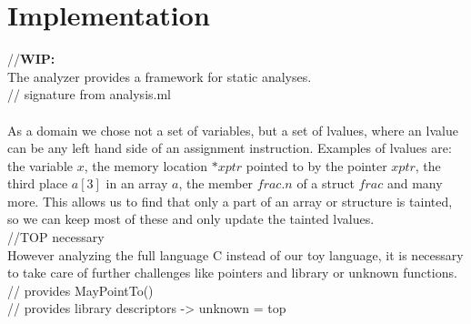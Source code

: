  \section{Implementation}
  //\textbf{WIP:}\\
    The \gob analyzer provides a framework for static analyses.\\ 
    // signature from analysis.ml\\
    \\
    As a domain we chose not a set of variables, but a set of lvalues, where an lvalue can be any left hand side of an assignment instruction. Examples of lvalues are: the variable $x$, the memory location $*xptr$ pointed to by the pointer $xptr$, the third place $a[3]$ in an array $a$, the member $frac.n$ of a struct $frac$ and many more. This allows us to find that only a part of an array or structure is tainted, so we can keep most of these and only update the tainted lvalues.\\
    //TOP necessary\\
    However analyzing the full language C instead of our toy language, it is necessary to take care of further challenges like pointers and library or unknown functions.\\
    // \gob provides \textsf{MayPointTo}()\\
    // \gob provides library descriptors -> unknown = top\\






